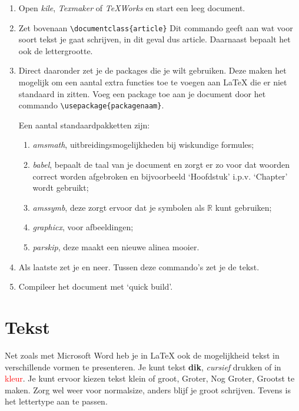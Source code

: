 \begin{enumerate}
	\item Open \emph{kile}, \emph{Texmaker} of \emph{TeXWorks} en start een leeg
	document.

	\item Zet bovenaan \verb.\documentclass{article}. Dit commando geeft aan wat
	voor soort tekst je gaat schrijven, in dit geval dus article. Daarnaast
	bepaalt het ook de lettergrootte.

	\item Direct daaronder zet je de packages die je wilt gebruiken. Deze maken
	het mogelijk om een aantal extra functies toe te voegen aan \LaTeX{} die er
	niet standaard in zitten. Voeg een package toe aan je document door het
	commando \verb|\usepackage{packagenaam}|.

	Een aantal standaardpakketten zijn:
	\begin{enumerate}[1)] %
		\item \emph{amsmath}, uitbreidingsmogelijkheden bij wiskundige formules;
		\item \emph{babel}, bepaalt de taal van je document en zorgt er zo voor
		dat woorden correct worden afgebroken en bijvoorbeeld `Hoofdstuk' i.p.v.
		`Chapter' wordt gebruikt;
		\item \emph{amssymb}, deze zorgt ervoor dat je symbolen als
		\(\mathbb{R}\) kunt gebruiken;
		\item \emph{graphicx}, voor afbeeldingen;
		\item \emph{parskip}, deze maakt een nieuwe alinea mooier.
	\end{enumerate}

	\item Als laatste zet je \verb.. en \verb..
	neer. Tussen deze commando's zet je de tekst.

	\item Compileer het document met `quick build'.
\end{enumerate}

\section{Tekst}
Net zoals met Microsoft Word heb je in \LaTeX{} ook de mogelijkheid tekst in
verschillende vormen te presenteren. Je kunt tekst \textbf{dik},
\textit{cursief} drukken of in \textcolor{red}{kleur}. Je kunt ervoor kiezen
tekst \small klein of \large groot, \Large Groter, \huge Nog Groter, \Huge
Grootst te maken. Zorg wel weer voor \normalsize normalsize, anders blijf je
groot schrijven. Tevens is het lettertype aan te passen.


